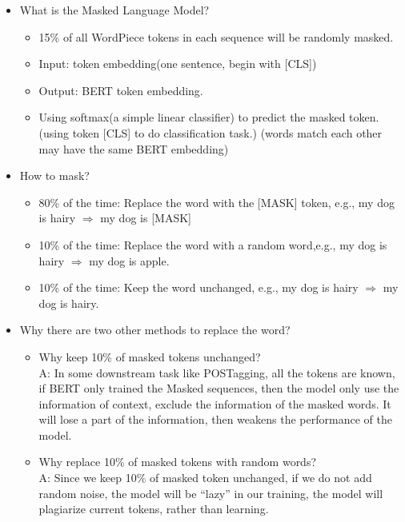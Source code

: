 \documentclass[]{krantz}
\providecommand{\tightlist}{%
  \setlength{\itemsep}{0pt}\setlength{\parskip}{0pt}}
\begin{document}
\begin{itemize}
\tightlist
\item
  What is the Masked Language Model?

  \begin{itemize}
  \tightlist
  \item
    15\% of all WordPiece tokens in each sequence will be randomly masked.
  \item
    Input: token embedding(one sentence, begin with {[}CLS{]})
  \item
    Output: BERT token embedding.
  \item
    Using softmax(a simple linear classifier) to predict the masked token. (using token {[}CLS{]} to do classification task.)
    (words match each other may have the same BERT embedding)
  \end{itemize}
\item
  How to mask?

  \begin{itemize}
  \tightlist
  \item
    80\% of the time: Replace the word with the {[}MASK{]} token, e.g., my dog is hairy \(\Rightarrow\) my dog is {[}MASK{]}
  \item
    10\% of the time: Replace the word with a random word,e.g., my dog is hairy \(\Rightarrow\) my dog is apple.
  \item
    10\% of the time: Keep the word unchanged, e.g., my dog is hairy \(\Rightarrow\) my dog is hairy.
  \end{itemize}
\item
  Why there are two other methods to replace the word?

  \begin{itemize}
  \tightlist
  \item
    Why keep 10\% of masked tokens unchanged?\\
    A: In some downstream task like POSTagging, all the tokens are known, if BERT only trained the Masked sequences, then the model only use the information of context, exclude the information of the masked words. It will lose a part of the information, then weakens the performance of the model.
  \item
    Why replace 10\% of masked tokens with random words?\\
    A: Since we keep 10\% of masked token unchanged, if we do not add random noise, the model will be ``lazy'' in our training, the model will plagiarize current tokens, rather than learning.
  \end{itemize}
\end{itemize}
\end{document}
